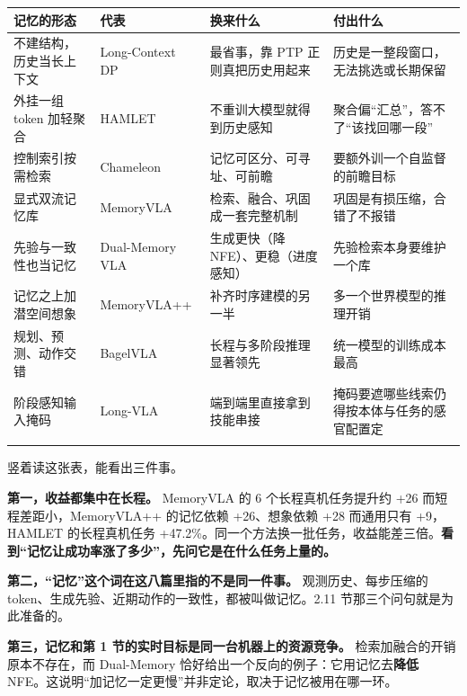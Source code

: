 \documentclass[
  chinese,
]{ctexart}
\begin{document}
\begin{center}
\begin{tabular}{@{}>{\raggedright\arraybackslash}p{} >{\raggedright\arraybackslash}p{} >{\raggedright\arraybackslash}p{} >{\raggedright\arraybackslash}p{}@{}}
\toprule\noalign{}
记忆的形态 & 代表 & 换来什么 & 付出什么 \\
\midrule\noalign{}
不建结构，历史当长上下文 & Long-Context DP & 最省事，靠 PTP 正则真把历史用起来 & 历史是一整段窗口，无法挑选或长期保留 \\
外挂一组 token 加轻聚合 & HAMLET & 不重训大模型就得到历史感知 & 聚合偏``汇总''，答不了``该找回哪一段'' \\
控制索引按需检索 & Chameleon & 记忆可区分、可寻址、可前瞻 & 要额外训一个自监督的前瞻目标 \\
显式双流记忆库 & MemoryVLA & 检索、融合、巩固成一套完整机制 & 巩固是有损压缩，合错了不报错 \\
先验与一致性也当记忆 & Dual-Memory VLA & 生成更快（降 NFE）、更稳（进度感知） & 先验检索本身要维护一个库 \\
记忆之上加潜空间想象 & MemoryVLA++ & 补齐时序建模的另一半 & 多一个世界模型的推理开销 \\
规划、预测、动作交错 & BagelVLA & 长程与多阶段推理显著领先 & 统一模型的训练成本最高 \\
阶段感知输入掩码 & Long-VLA & 端到端里直接拿到技能串接 & 掩码要遮哪些线索仍得按本体与任务的感官配置定 \\
\bottomrule\noalign{}
\end{tabular}
\end{center}

竖着读这张表，能看出三件事。

\textbf{第一，收益都集中在长程。} MemoryVLA 的 6 个长程真机任务提升约
+26 而短程差距小，MemoryVLA++ 的记忆依赖 +26、想象依赖 +28 而通用只有
+9，HAMLET 的长程真机任务
+47.2\%。同一个方法换一批任务，收益能差三倍。\textbf{看到``记忆让成功率涨了多少''，先问它是在什么任务上量的。}

\textbf{第二，``记忆''这个词在这八篇里指的不是同一件事。}
观测历史、每步压缩的
token、生成先验、近期动作的一致性，都被叫做记忆。2.11
节那三个问句就是为此准备的。

\textbf{第三，记忆和第 1 节的实时目标是同一台机器上的资源竞争。}
检索加融合的开销原本不存在，而 Dual-Memory
恰好给出一个反向的例子：它用记忆去\textbf{降低}
NFE。这说明``加记忆一定更慢''并非定论，取决于记忆被用在哪一环。
\end{document}
